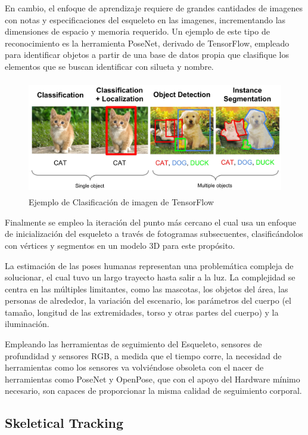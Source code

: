 En cambio, el enfoque de aprendizaje requiere de grandes cantidades de imagenes con notas y especificaciones del esqueleto en las imagenes, incrementando las dimensiones de espacio y memoria requerido. Un ejemplo de este tipo de reconocimiento es la herramienta PoseNet, derivado de TensorFlow, empleado para identificar objetos a partir de una base de datos propia que clasifique los elementos que se buscan identificar con silueta y nombre.

\begin{figure}[t!]
	\centering
	\includegraphics[width=13cm,height=5cm,]{./Images/ejemplotensorflow.jpg}
	\caption{Ejemplo de Clasificación de imagen de TensorFlow}
	\label{tensorfl}
\end{figure}

Finalmente se empleo la iteración del punto más cercano \cite{grest2005nonlinear} el cual usa un enfoque de inicialización del esqueleto a través de fotogramas subsecuentes, clasificándolos con vértices y segmentos en un modelo 3D para este propósito.

La estimación de las poses humanas representan una problemática compleja de solucionar, el cual tuvo un largo trayecto hasta salir a la luz. La complejidad se centra en las múltiples limitantes, como las mascotas, los objetos del área, las personas de alrededor, la variación del escenario, los parámetros del cuerpo (el tamaño, longitud de las extremidades, torso y otras partes del cuerpo) y la iluminación.

Empleando las herramientas de seguimiento del Esqueleto, sensores de profundidad y sensores RGB, a medida que el tiempo corre, la necesidad de herramientas como los sensores va volviéndose obsoleta con el nacer de herramientas como PoseNet y OpenPose, que con el apoyo del Hardware mínimo necesario, son capaces de proporcionar la misma calidad de seguimiento corporal.


\subsection{Skeletical Tracking}

